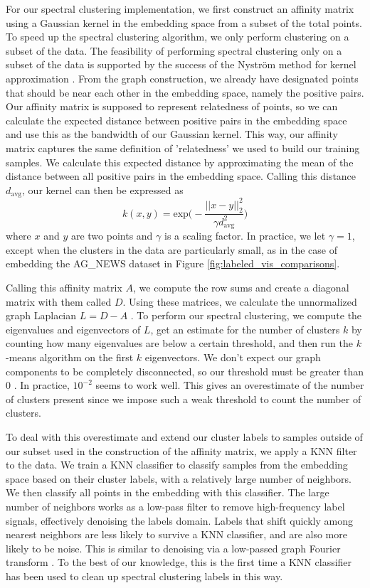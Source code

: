 \documentclass{article}
\begin{document}
For our spectral clustering implementation, we first construct an affinity matrix using a Gaussian kernel in the embedding space from a subset of the total points. To speed up the spectral clustering algorithm, we only perform clustering on a subset of the data. The feasibility of performing spectral clustering only on a subset of the data is supported by the success of the Nystr{\"o}m method for kernel approximation \cite{williams2001using}. From the graph construction, we already have designated points that should be near each other in the embedding space, namely the positive pairs. Our affinity matrix is supposed to represent relatedness of points, so we can calculate the expected distance between positive pairs in the embedding space and use this as the bandwidth of our Gaussian kernel. This way, our affinity matrix captures the same definition of 'relatedness' we used to build our training samples. We calculate this expected distance by approximating the mean of the distance between all positive pairs in the embedding space. Calling this distance $d_{\text{avg}}$, our kernel can then be expressed as \[ k(x, y) = \text{exp}\bigg(-\frac{||x-y||_2^2}{\gamma d_{\text{avg}}^2}\bigg) \] where $x$ and $y$ are two points and $\gamma$ is a scaling factor. In practice, we let $\gamma = 1$, except when the clusters in the data are particularly small, as in the case of embedding the AG\_NEWS dataset in Figure \ref{fig:labeled_vis_comparisons}.

Calling this affinity matrix $A$, we compute the row sums and create a diagonal matrix with them called $D$. Using these matrices, we calculate the unnormalized graph Laplacian $L=D-A$ \cite{von2007tutorial}. To perform our spectral clustering, we compute the eigenvalues and eigenvectors of $L$, get an estimate for the number of clusters $k$ by counting how many eigenvalues are below a certain threshold, and then run the $k$-means algorithm on the first $k$ eigenvectors. We don't expect our graph components to be completely disconnected, so our threshold must be greater than $0$ \cite{von2007tutorial}. In practice, $10^{-2}$ seems to work well. This gives an overestimate of the number of clusters present since we impose such a weak threshold to count the number of clusters.

To deal with this overestimate and extend our cluster labels to samples outside of our subset used in the construction of the affinity matrix, we apply a KNN filter to the data. We train a KNN classifier to classify samples from the embedding space based on their cluster labels, with a relatively large number of neighbors. We then classify all points in the embedding with this classifier. The large number of neighbors works as a low-pass filter to remove high-frequency label signals, effectively denoising the labels domain. Labels that shift quickly among nearest neighbors are less likely to survive a KNN classifier, and are also more likely to be noise. This is similar to denoising via a low-passed graph Fourier transform \cite{6808520}. To the best of our knowledge, this is the first time a KNN classifier has been used to clean up spectral clustering labels in this way.
\end{document}
